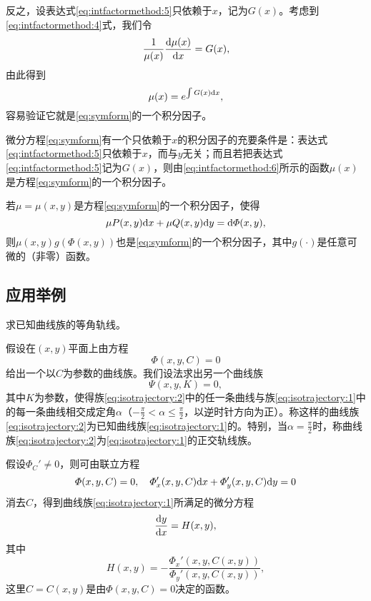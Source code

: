 反之，设表达式\eqref{eq:intfactormethod:5}只依赖于$x$，记为$G(x)$。考虑到\eqref{eq:intfactormethod:4}式，我们令
\[
\frac{1}{\mu(x)}\frac{\mathrm{d}{}\mu(x)}{\mathrm{d}{}x}=G(x),
\]
由此得到
\begin{equation}\label{eq:intfactormethod:6}
\mu(x)=e^{\int G(x)\mathrm{d} x},
\end{equation}
容易验证它就是\eqref{eq:symform}的一个积分因子。
\begin{theo}\label{theo:intfactormethod:1}
微分方程\eqref{eq:symform}有一个只依赖于$x$的积分因子的充要条件是：表达式\eqref{eq:intfactormethod:5}只依赖于$x$，而与$y$无关；而且若把表达式\eqref{eq:intfactormethod:5}记为$G(x)$，则由\eqref{eq:intfactormethod:6}所示的函数$\mu(x)$是方程\eqref{eq:symform}的一个积分因子。
\end{theo}
\begin{theo}\label{theo:intfactormethod:2}
若$\mu=\mu(x,y)$是方程\eqref{eq:symform}的一个积分因子，使得
\[
\mu P(x,y)\mathrm{d} x+\mu Q(x,y)\mathrm{d} y=\mathrm{d}\varPhi(x,y),
\]
则$\mu(x,y)g(\varPhi(x,y))$也是\eqref{eq:symform}的一个积分因子，其中$g(\cdot)$是任意可微的（非零）函数。
\end{theo}

\subsection{应用举例}
\begin{example}
求已知曲线族的等角轨线。

假设在$(x,y)$平面上由方程
\begin{equation}\label{eq:isotrajectory:1}
\varPhi(x,y,C)=0
\end{equation}
给出一个以$C$为参数的曲线族。我们设法求出另一个曲线族
\begin{equation}\label{eq:isotrajectory:2}
\varPsi(x,y,K)=0,
\end{equation}
其中$K$为参数，使得族\eqref{eq:isotrajectory:2}中的任一条曲线与族\eqref{eq:isotrajectory:1}中的每一条曲线相交成定角$\alpha$（$-\frac{\pi}{2}<\alpha\leq\frac{\pi}{2}$，以逆时针方向为正）。称这样的曲线族\eqref{eq:isotrajectory:2}为已知曲线族\eqref{eq:isotrajectory:1}的。特别，当$\alpha=\frac{\pi}{2}$时，称曲线族\eqref{eq:isotrajectory:2}为\eqref{eq:isotrajectory:1}的正交轨线族。
\end{example}

假设$\varPhi_C'\neq 0$，则可由联立方程
\begin{equation}\label{eq:isotrajectory:3}
\varPhi(x,y,C)=0,\quad \varPhi_x'(x,y,C)\mathrm{d} x+\varPhi_y'(x,y,C)\mathrm{d} y=0
\end{equation}
消去$C$，得到曲线族\eqref{eq:isotrajectory:1}所满足的微分方程
\begin{equation}\label{eq:isotrajectory:4}
\frac{\mathrm{d}{}y}{\mathrm{d}{}x}=H(x,y),
\end{equation}
其中
\[
H(x,y)=-\frac{\varPhi_x'(x,y,C(x,y))}{\varPhi_y'(x,y,C(x,y))},
\]
这里$C=C(x,y)$是由$\varPhi(x,y,C)=0$决定的函数。

